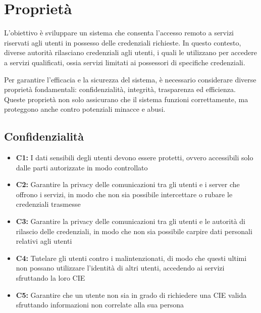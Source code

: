 \section{Proprietà}
    L'obiettivo è sviluppare un sistema che consenta l'accesso remoto a servizi riservati agli utenti in possesso delle credenziali richieste.
    In questo contesto, diverse autorità rilasciano credenziali agli utenti, i quali le utilizzano per accedere a servizi qualificati, ossia servizi limitati ai possessori di specifiche credenziali.
    
    Per garantire l'efficacia e la sicurezza del sistema, è necessario considerare diverse proprietà fondamentali: confidenzialità, integrità, trasparenza ed efficienza.
    Queste proprietà non solo assicurano che il sistema funzioni correttamente, ma proteggono anche contro potenziali minacce e abusi.

    
    \subsection{Confidenzialità}
        \begin{itemize}
            \item \textbf{C1:} I dati sensibili degli utenti devono essere protetti, ovvero accessibili solo dalle parti autorizzate in modo controllato
            
            \item \textbf{C2:} Garantire la privacy delle comunicazioni tra gli utenti e i server che offrono i servizi, in modo che non sia possibile intercettare o rubare le credenziali trasmesse

            \item \textbf{C3:} Garantire la privacy delle comunicazioni tra gli utenti e le autorità di rilascio delle credenziali, in modo che non sia possibile carpire dati personali relativi agli utenti
            
            \item \textbf{C4:} Tutelare gli utenti contro i malintenzionati, di modo che questi ultimi non possano utilizzare l'identità di altri utenti, accedendo ai servizi sfruttando la loro CIE

            \item \textbf{C5:} Garantire che un utente non sia in grado di richiedere una CIE valida sfruttando informazioni non correlate alla sua persona
        \end{itemize}


